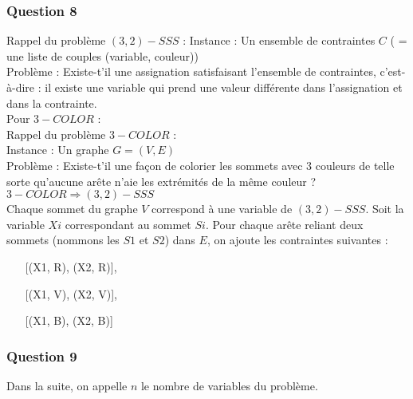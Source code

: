 \documentclass{report}
\begin{document}
\subsubsection*{Question 8}

Rappel du problème $(3,2)-SSS$ :
Instance : Un ensemble de contraintes $C$ ( = une liste de couples (variable, couleur))\\
Problème : Existe-t'il une assignation satisfaisant l'ensemble de contraintes, c'est-à-dire : il existe une variable qui prend une valeur différente dans l’assignation et dans la contrainte.\\

Pour $3-COLOR$ :\\
Rappel du problème $3-COLOR$ :\\
Instance : Un graphe $G = (V,E)$\\
Problème : Existe-t’il une façon de colorier les sommets avec 3 couleurs de telle sorte qu’aucune arête n’aie les extrémités de la même couleur ?\\

$3-COLOR \Rightarrow (3,2)-SSS$\\
Chaque sommet du graphe $V$ correspond à une variable de $(3, 2)-SSS$.
Soit la variable $Xi$ correspondant au sommet $Si$.
Pour chaque arête reliant deux sommets (nommons les $S1$ et $S2$) dans $E$, on ajoute les contraintes suivantes :\\
\begin{itemize}
\item[] [(X1, R), (X2, R)],
\item[] [(X1, V), (X2, V)],
\item[] [(X1, B), (X2, B)]
\end{itemize}

\subsubsection*{Question 9}

Dans la suite, on appelle $n$ le nombre de variables du problème.
\end{document}
